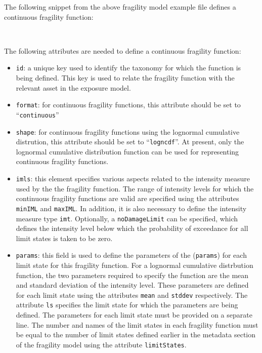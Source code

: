 The following snippet from the above \gls{fragility model} example file
defines a continuous \gls{fragility function}:

\inputminted[firstline=19,firstnumber=19,lastline=25,fontsize=\footnotesize,frame=single,linenos,bgcolor=lightgray]{xml}{oqum/risk/Verbatim/input_fragility.xml}\\

The following attributes are needed to define a continuous \gls{fragility function}:

\begin{itemize}

    \item \Verb+id+: a unique key used to identify the \gls{taxonomy} for 
    which the function is being defined. This key is used to relate the 
    \gls{fragility function} with the relevant \gls{asset} in the 
    \gls{exposure model}.

    \item \Verb+format+: for continuous fragility functions, this attribute 
    should be set to ``\Verb+continuous+''

    \item \Verb+shape+: for continuous fragility functions using the lognormal
    cumulative distrution, this attribute should be set to ``\Verb+logncdf+''.
    At present, only the lognormal cumulative distribution function can be 
    used for representing continuous fragility functions.

    \item \Verb+imls+: this element specifies various aspects related to the 
    intensity measure used by the the \gls{fragility function}. The range of 
    intensity levels for which the continuous fragility functions are valid 
    are specified using the attributes \Verb+minIML+ and \Verb+maxIML+. 
    In addition, it is also necessary to define the intensity measure type 
    \Verb+imt+. Optionally, a \Verb+noDamageLimit+ can be specified, which 
    defines the intensity level below which the probability of exceedance 
    for all limit states is taken to be zero.

    \item \Verb+params+: this field is used to define the parameters of 
    the (\Verb+params+) for each limit state for this 
    \gls{fragility function}. For a lognormal cumulative distrbution function, 
    the two parameters required to specify the function are the mean and 
    standard deviation of the intensity level. These parameters are defined for 
    each limit state using the attributes \Verb+mean+ and \Verb+stddev+ 
    respectively. The attribute \Verb+ls+ specifies the limit state for which 
    the parameters are being defined. The parameters for each limit state
    must be provided on a separate line. The number and names of the limit 
    states in each fragility function must be equal to the number of limit 
    states defined earlier in the metadata section of the \gls{fragility model}
    using the attribute \Verb+limitStates+.

\end{itemize}


